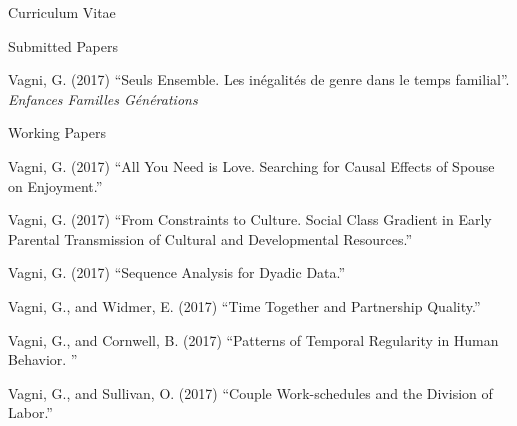 \documentclass[12pt,a4paper]{article}
\begin{document}
\begin{cv}{Curriculum Vitae}
 \begin{cvlist}{Submitted Papers}
 	\footnotesize   	
 	\item Vagni, G. (2017) ``Seuls Ensemble. Les in{\'e}galit{\'e}s de genre dans le temps familial''. \emph{Enfances Familles G{\'e}n{\'e}rations}
 			      
 \end{cvlist}

  \begin{cvlist}{Working Papers}
  	\footnotesize   	
  	\item Vagni, G. (2017) ``All You Need is Love. Searching for Causal Effects of Spouse on Enjoyment.'' 
  	\item Vagni, G. (2017)  ``From Constraints to Culture. Social Class Gradient in Early Parental Transmission of Cultural and Developmental Resources.'' 
  	 \item Vagni, G. (2017)  ``Sequence Analysis for Dyadic Data.'' 
  	\item Vagni, G., and Widmer, E. (2017)  ``Time Together and Partnership Quality.'' 
  	\item Vagni, G., and Cornwell, B. (2017)  ``Patterns of Temporal Regularity in Human Behavior. '' 
  	\item Vagni, G., and Sullivan, O. (2017)  ``Couple Work-schedules and the Division of Labor.''
  			      
  \end{cvlist}


  \date{~June~2017}
\end{cv}
\end{document}
